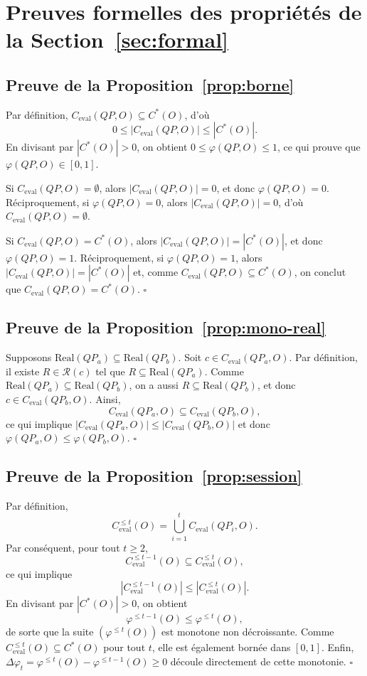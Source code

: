 \documentclass[journal]{IEEEtran}
\begin{document}
\appendices

\section{Preuves formelles des propriétés de la Section~\ref{sec:formal}}
\label{app:proofs}

\subsection*{Preuve de la Proposition~\ref{prop:borne}}

Par définition, $C_{\mathrm{eval}}(QP,O)\subseteq C^*(O)$, d'où
\[
0\le |C_{\mathrm{eval}}(QP,O)|\le |C^*(O)|.
\]
En divisant par $|C^*(O)|>0$, on obtient $0\le \varphi(QP,O)\le 1$, ce qui prouve que $\varphi(QP,O)\in[0,1]$.

Si $C_{\mathrm{eval}}(QP,O)=\emptyset$, alors $|C_{\mathrm{eval}}(QP,O)|=0$, et donc $\varphi(QP,O)=0$. Réciproquement, si $\varphi(QP,O)=0$, alors $|C_{\mathrm{eval}}(QP,O)|=0$, d'où $C_{\mathrm{eval}}(QP,O)=\emptyset$.

Si $C_{\mathrm{eval}}(QP,O)=C^*(O)$, alors $|C_{\mathrm{eval}}(QP,O)|=|C^*(O)|$, et donc $\varphi(QP,O)=1$. Réciproquement, si $\varphi(QP,O)=1$, alors $|C_{\mathrm{eval}}(QP,O)|=|C^*(O)|$ et, comme $C_{\mathrm{eval}}(QP,O)\subseteq C^*(O)$, on conclut que $C_{\mathrm{eval}}(QP,O)=C^*(O)$. \hfill$\square$

\subsection*{Preuve de la Proposition~\ref{prop:mono-real}}

Supposons $\mathrm{Real}(QP_a)\subseteq \mathrm{Real}(QP_b)$. Soit $c\in C_{\mathrm{eval}}(QP_a,O)$. Par définition, il existe $R\in\mathcal{R}(c)$ tel que $R\subseteq \mathrm{Real}(QP_a)$. Comme $\mathrm{Real}(QP_a)\subseteq \mathrm{Real}(QP_b)$, on a aussi $R\subseteq \mathrm{Real}(QP_b)$, et donc $c\in C_{\mathrm{eval}}(QP_b,O)$. Ainsi,
\[
C_{\mathrm{eval}}(QP_a,O)\subseteq C_{\mathrm{eval}}(QP_b,O),
\]
ce qui implique $|C_{\mathrm{eval}}(QP_a,O)|\le |C_{\mathrm{eval}}(QP_b,O)|$ et donc $\varphi(QP_a,O)\le \varphi(QP_b,O)$. \hfill$\square$

\subsection*{Preuve de la Proposition~\ref{prop:session}}

Par définition,
\[
C_{\mathrm{eval}}^{\le t}(O)=\bigcup_{i=1}^{t} C_{\mathrm{eval}}(QP_i,O).
\]
Par conséquent, pour tout $t\ge 2$,
\[
C_{\mathrm{eval}}^{\le t-1}(O)\subseteq C_{\mathrm{eval}}^{\le t}(O),
\]
ce qui implique
\[
|C_{\mathrm{eval}}^{\le t-1}(O)|\le |C_{\mathrm{eval}}^{\le t}(O)|.
\]
En divisant par $|C^*(O)|>0$, on obtient
\[
\varphi^{\le t-1}(O)\le \varphi^{\le t}(O),
\]
de sorte que la suite $(\varphi^{\le t}(O))$ est monotone non décroissante. Comme $C_{\mathrm{eval}}^{\le t}(O)\subseteq C^*(O)$ pour tout $t$, elle est également bornée dans $[0,1]$. Enfin, $\Delta\varphi_t=\varphi^{\le t}(O)-\varphi^{\le t-1}(O)\ge 0$ découle directement de cette monotonie. \hfill$\square$
\end{document}
